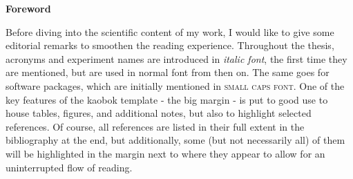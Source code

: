 
\thispagestyle{plain}
\begin{minipage}[c][0.4\textheight][b]{0.9\textwidth}
    \huge
    \textbf{Foreword}
    \normalsize
    \par
    \vspace{1.0cm}
    Before diving into the scientific content of my work, I would like to give some editorial remarks to smoothen the reading experience. Throughout the thesis, acronyms and experiment names are introduced in \textit{italic font}, the first time they are mentioned, but are used in normal font from then on. The same goes for software packages, which are initially mentioned in \textsc{small caps font}. One of the key features of the kaobok template - the big margin - is put to good use to house tables, figures, and additional notes, but also to highlight selected references. Of course, all references are listed in their full extent in the bibliography at the end, but additionally, some (but not necessarily all) of them will be highlighted in the margin next to where they appear to allow for an uninterrupted flow of reading.
\end{minipage}
